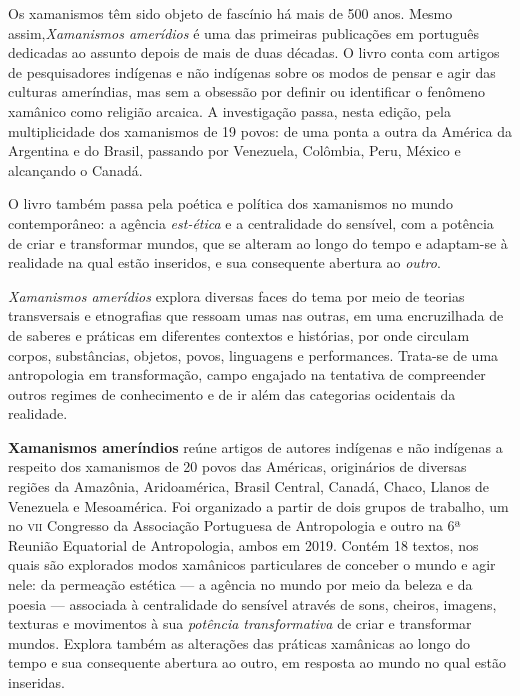 
Os xamanismos têm sido objeto de fascínio há mais de 500 anos. Mesmo assim,\textit{Xamanismos amerídios} é uma das primeiras publicações em português dedicadas ao assunto depois de mais de duas décadas. O livro conta com artigos de pesquisadores indígenas e não indígenas sobre os modos de pensar e agir das culturas ameríndias, mas sem a obsessão por definir ou identificar o fenômeno xamânico como religião arcaica. A investigação passa, nesta edição, pela multiplicidade dos xamanismos de 19 povos: de uma ponta a outra da América da Argentina e do Brasil, passando por Venezuela, Colômbia, Peru, México e alcançando o Canadá.

O livro também passa pela poética e política dos xamanismos no mundo contemporâneo: a agência \textit{est-ética} e a centralidade do sensível, com a potência de criar e transformar mundos, que se alteram ao longo do tempo e adaptam-se à realidade na qual estão inseridos, e sua consequente abertura ao \textit{outro}.

\textit{Xamanismos amerídios} explora diversas faces do tema por meio de teorias transversais e etnografias que ressoam umas nas outras, em uma encruzilhada de de saberes e práticas em diferentes contextos e histórias, por onde circulam corpos, substâncias, objetos, povos, linguagens e performances. Trata-se de uma antropologia em transformação, campo engajado na tentativa de compreender outros regimes de conhecimento e de ir além das categorias ocidentais da realidade.

\textbf{Xamanismos ameríndios} reúne artigos de autores indígenas e não indígenas a respeito dos xamanismos de 20 povos das Américas, originários de diversas regiões da Amazônia, Aridoamérica, Brasil Central, Canadá, Chaco, Llanos de Venezuela e Mesoamérica. Foi organizado a partir de dois grupos de trabalho, um no \textsc{vii} Congresso da Associação Portuguesa de Antropologia e outro na 6ª Reunião Equatorial de Antropologia, ambos em 2019. Contém 18 textos, nos quais são explorados modos xamânicos particulares de conceber o mundo e agir nele: da permeação estética ---  a agência no mundo por meio da beleza e da poesia --- associada à centralidade do sensível através de sons, cheiros, imagens, texturas e movimentos à sua \textit{potência transformativa} de criar e transformar mundos. Explora também as alterações das práticas xamânicas ao longo do tempo e sua consequente abertura ao outro, em resposta ao mundo no qual estão inseridas.

